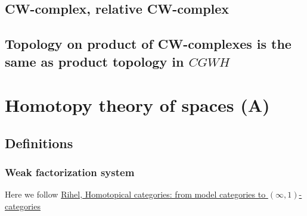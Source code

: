 \subsection{CW-complex, relative CW-complex}
\subsection{Topology on product of CW-complexes is the same as product topology in $CGWH$}

\section{Homotopy theory  of spaces (A)}
\subsection{Definitions}
\subsubsection{Weak factorization system}

Here we follow \href{https://arxiv.org/pdf/1904.0088}{Rihel, Homotopical categories: from model categories to $(\infty,1)$-categories}

